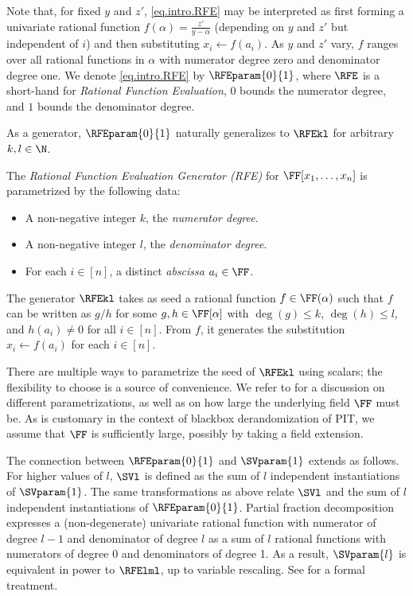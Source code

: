 \documentclass{toc}
\begin{document}
Note that, for fixed \(y\) and \(z'\), \eqref{eq.intro.RFE} may be interpreted
as first forming a univariate rational function
\(f(\alpha) = \frac{z'}{y-\alpha}\)
(depending on \(y\) and \(z'\) but independent of \(i\))
and then substituting \(x_i\gets f(a_i)\).
As \(y\) and \(z'\) vary,
\(f\) ranges over all rational functions in \(\alpha\) with numerator degree zero and
denominator degree one.
We denote \eqref{eq.intro.RFE} by \(\RFEparam{0}{1}\),
where $\RFE$ is a short-hand for {\em Rational Function Evaluation},
\(0\) bounds the numerator degree, and \(1\) bounds the denominator degree.

As a generator, \(\RFEparam{0}{1}\) naturally generalizes to $\RFEkl$ for
arbitrary $k, l \in \N$.
\begin{definition}
  \label{def.rfegen}
  The \emph{Rational Function Evaluation Generator (RFE)} for
  \(\FF[x_1,\ldots,x_n]\) is
  parametrized by the following data:
  \begin{itemize}
    \item
      A non-negative integer \(k\), the \emph{numerator degree}.
    \item
      A non-negative integer \(l\), the \emph{denominator degree}.
    \item For each \(i\in [n]\), a distinct \emph{abscissa} \(a_i \in \FF\).
  \end{itemize}
  The generator \(\RFEkl\) takes as seed a rational function \(f \in \FF(\alpha)\)
  such that \(f\) can be written as \(g/h\) for some \(g,h\in\FF[\alpha]\)
  with \(\deg(g)\le k\), \(\deg(h)\le l\), and \(h(a_i)\ne0\)
  for all \(i\in[n]\).
  From \(f\),
  it generates the substitution \( x_i \gets f(a_i) \) for each \(i\in[n]\).
\end{definition}
There are multiple ways to parametrize the seed of \(\RFEkl\) using scalars; the flexibility to choose is a source of convenience. We refer to  for a discussion on different parametrizations, as well as on how large the underlying field $\FF$ must be.
As is customary in the context of blackbox derandomization of PIT, we assume that $\FF$ is sufficiently large, possibly by taking a field extension.

The connection between \(\RFEparam{0}{1}\) and $\SVparam{1}$ extends as
follows.
For higher values of $l$, $\SVl$ is defined as the sum of $l$ independent
instantiations of $\SVparam{1}$.
The same transformations as above relate $\SVl$ and the sum of $l$ independent
instantiations of $\RFEparam{0}{1}$. 
Partial fraction decomposition expresses a (non-degenerate) univariate rational function with numerator of
degree $l-1$ and denominator of degree $l$ as a sum of $l$ rational functions with numerators of degree 0 and denominators of degree 1. As a result, $\SVparam{l}$ is equivalent in power to $\RFElml$, up to variable rescaling. See  for a formal treatment. 
\end{document}
